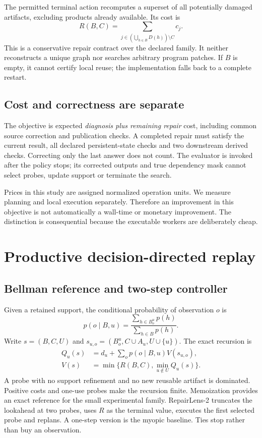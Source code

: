 \documentclass[10pt,letterpaper]{article}
\begin{document}
The permitted terminal action recomputes a superset of all potentially damaged artifacts, excluding products already available. Its cost is
\begin{equation}
 R(B,C)=\sum_{j\in (\bigcup_{h\in B}D(h))\setminus C}c_j.
 \label{eq:terminal}
\end{equation}
This is a conservative repair contract over the declared family. It neither reconstructs a unique graph nor searches arbitrary program patches. If $B$ is empty, it cannot certify local reuse; the implementation falls back to a complete restart.

\subsection{Cost and correctness are separate}
The objective is expected \emph{diagnosis plus remaining repair} cost, including common source correction and publication checks. A completed repair must satisfy the current result, all declared persistent-state checks and two downstream derived checks. Correcting only the last answer does not count. The evaluator is invoked after the policy stops; its corrected outputs and true dependency mask cannot select probes, update support or terminate the search.

Prices in this study are assigned normalized operation units. We measure planning and local execution separately. Therefore an improvement in this objective is not automatically a wall-time or monetary improvement. The distinction is consequential because the executable workers are deliberately cheap.

\section{Productive decision-directed replay}
\subsection{Bellman reference and two-step controller}
Given a retained support, the conditional probability of observation $o$ is
\begin{equation}
 p(o\mid B,u)=\frac{\sum_{h\in B_o^u}p(h)}{\sum_{h\in B}p(h)}.
\end{equation}
Write $s=(B,C,U)$ and $s_{u,o}=(B_o^u,C\cup A_u,U\cup\{u\})$. The exact recursion is
\begin{align}
 Q_u(s)&=d_u+\sum_o p(o\mid B,u)V(s_{u,o}),\\
 V(s)&=\min\{R(B,C),\min_{u\notin U}Q_u(s)\}.
 \label{eq:bellman}
\end{align}
A probe with no support refinement and no new reusable artifact is dominated. Positive costs and one-use probes make the recursion finite. Memoization provides an exact reference for the small experimental family. RepairLens-2 truncates the lookahead at two probes, uses $R$ as the terminal value, executes the first selected probe and replans. A one-step version is the myopic baseline. Ties stop rather than buy an observation.
\end{document}
